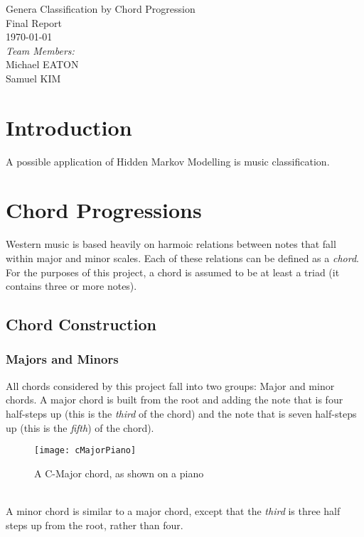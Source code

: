 \documentclass{article}
\begin{document}
\fancyhf{}
\rhead{\today}

\begin{titlepage}
\begin{center}
{\huge Genera Classification by Chord Progression}\\[2cm]
{\Large Final Report}\\[2cm]
{\large \today}\\[2cm]
\emph{Team Members:}\\
Michael \uppercase{Eaton}\\
Samuel \uppercase{Kim}\\
\end{center}
\end{titlepage}

\tableofcontents
\newpage

\section{Introduction}
A possible application of Hidden Markov Modelling is music classification.  

\newpage

\section{Chord Progressions}
Western music is based heavily on harmoic relations between notes that fall within major and minor scales. Each of these relations can be defined as a \emph{chord}.  For the purposes of this project, a chord is assumed to be at least a triad (it contains three or more notes).
\subsection{Chord Construction}
\subsubsection{Majors and Minors}
All chords considered by this project fall into two groups:  Major and minor chords.  A major chord is built from the root and adding the note that is four half-steps up (this is the \emph{third} of the chord) and the note that is seven half-steps up (this is the \emph{fifth}) of the chord).\\
\begin{figure}[htb]
\texttt{[image: cMajorPiano]}
\caption{A  C-Major chord, as shown on a piano}
\end{figure} \\
A minor chord is similar to a major chord, except that the \emph{third} is three half steps up from the root, rather than four.
\end{document}
